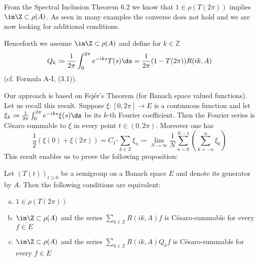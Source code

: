 From the Spectral Inclusion Theorem 6.2 we know that $1 \in \rho(T(2\pi))$ implies $\im\Z \subset \rho(A)$.
As seen in many examples the converse does not hold and we are now looking for additional conditions.

Henceforth we assume $\im\Z \subset \rho(A)$ and define for $k \in \mathbb{Z}$
\begin{equation}\label{eq:a3-7.8}
Q_{k}\coloneqq \frac{1}{2\pi}\int_{0}^{2\pi} e^{-iks}T(s)\ds = \frac{1}{2\pi}(1 - T(2\pi))R(ik,A)
\end{equation}
(cf. Formula A-I, (3.1)).

Our approach is based on Fejér's Theorem (for Banach space valued functions).
Let us recall this result.
Suppose $\xi \colon [0,2\pi] \to E$ is a continuous function and let $\xi_{k}\coloneqq \frac{1}{2\pi}\int_{0}^{2\pi} e^{-iks}\xi(s)\ds$ be its $k$-th Fourier coefficient.
Then the Fourier series is Césaro summable to $\xi$ in every point $t \in (0,2\pi)$.
Moreover one has
\begin{equation}\label{eq:a3-7.9}
\frac{1}{2}(\xi(0) + \xi(2\pi)) = C_{1}\text{-}\sum_{k\in\mathbb{Z}} \xi_{n} \coloneqq \lim_{N\to\infty} \frac{1}{N}\sum_{n=0}^{N-1}(\sum_{k=-n}^{n} \xi_{k})
\end{equation}
This result enables us to prove the following proposition:
\begin{proposition}\label{prop:a3-7.8}
Let $(T(t))_{t\geq 0}$ be a semigroup on a Banach space $E$ and denote its generator by $A$.
Then the following conditions are equivalent:

\begin{enumerate}[(a)]
\item $1 \in \rho(T(2\pi))$

\item 
$\im\Z \subset \rho(A)$ and the series $\sum_{k\in\mathbb{Z}} R(ik,A)f$ is Césaro-summable for every $f \in E$

\item 
$\im\Z \subset \rho(A)$ and the series $\sum_{k\in\mathbb{Z}} R(ik,A)Q_{k}f$ is Césaro-summable for every $f \in E$

\end{enumerate}
\end{proposition}


